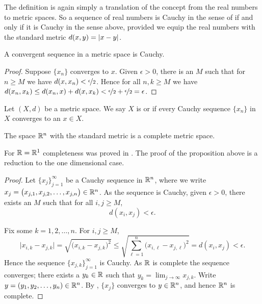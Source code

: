 The definition is again simply a translation of the concept
from the real numbers to metric spaces.  So a sequence of real
numbers is Cauchy in the sense of  if and only if
it is Cauchy in the sense above, provided we equip the real numbers with
the standard metric $d(x,y) = \left\lvert {x-y} \right\rvert$.

\begin{prop}
A convergent sequence in a metric space is Cauchy.
\end{prop}

\begin{proof}
Suppose $\{ x_n \}$ converges to $x$.
Given $\epsilon > 0$, there is an $M$ such that for $n \geq M$
we have $d(x,x_n) < \nicefrac{\epsilon}{2}$.  Hence
for all $n,k \geq M$ we have
$d(x_n,x_k) \leq d(x_n,x) + d(x,x_k) < \nicefrac{\epsilon}{2} +
\nicefrac{\epsilon}{2} = \epsilon$.
\end{proof}

\begin{defn}
Let $(X,d)$ be a metric space.  We say $X$ is
\emph{} or \emph{}
if every Cauchy sequence $\{ x_n \}$ in $X$
converges to an $x \in X$.
\end{defn}

\begin{prop}
The space ${\mathbb{R}}^n$ with the standard metric is a complete metric space.
\end{prop}

For ${\mathbb{R}} = {\mathbb{R}}^1$ completeness was proved in .  The proof of
the proposition above is a reduction to the one dimensional case.

\begin{proof}
Let $\{ x_j \}_{j=1}^\infty$ be a Cauchy sequence
in ${\mathbb{R}}^n$, where we write $x_j = \bigl(x_{j,1},x_{j,2},\ldots,x_{j,n}\bigr) \in {\mathbb{R}}^n$.
As the sequence is Cauchy, given $\epsilon > 0$, there exists an $M$ such that for all
$i,j \geq M$,
\begin{equation*}
d(x_i,x_j) < \epsilon.
\end{equation*}

Fix some $k=1,2,\ldots,n$.  For $i,j \geq M$,
\begin{equation*}
\bigl\lvert x_{i,k} - x_{j,k} \bigr\rvert
=
\sqrt{{\bigl(x_{i,k} - x_{j,k}\bigr)}^2}
\leq
\sqrt{\sum_{\ell=1}^n {\bigl(x_{i,\ell}-x_{j,\ell}\bigr)}^2}
= d(x_i,x_j) < \epsilon .
\end{equation*}
Hence the sequence $\{ x_{j,k} \}_{j=1}^\infty$ is Cauchy.  As ${\mathbb{R}}$ is
complete the sequence converges; there exists a $y_k \in {\mathbb{R}}$ such that
$y_k = \lim_{j\to\infty} x_{j,k}$.
Write $y = (y_1,y_2,\ldots,y_n) \in {\mathbb{R}}^n$.
By , $\{ x_j \}$ converges
to $y \in {\mathbb{R}}^n$, and hence ${\mathbb{R}}^n$ is complete.
\end{proof}

